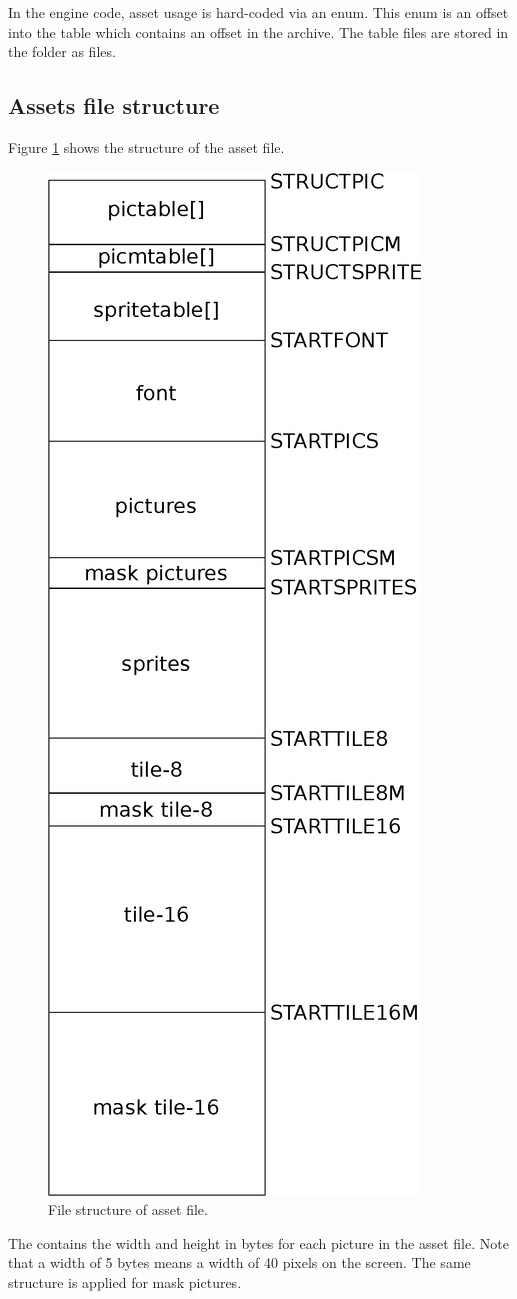 \documentclass[book.tex]{subfiles}
\begin{document}
 In the engine code, asset usage is hard-coded via an enum. This enum is an offset into the  table which contains an offset in the  archive. The  table files are stored in the  folder as  files.\\

\pagebreak

\subsection{Assets file structure}
\label{section:asset_file_structure}
Figure \ref{fig:asset-file} shows the structure of the  asset file.
\begin{figure}[H]
\centering
 \includegraphics[width=.4\textwidth]{imgs/drawings/graphic_assets.eps}
 \caption{File structure of  asset file.}
 \label{fig:asset-file}
\end{figure}

The  contains the width and height in bytes for each picture in the asset file. Note that a width of 5 bytes means a width of 40 pixels on the screen. The same structure is applied for mask pictures.\\
\end{document}
